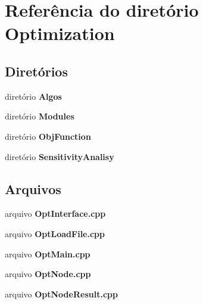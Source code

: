 \section{Referência do diretório Optimization}
\label{dir_cda0b9b7a1b6db4e2b773195a159b93c}
\subsection*{Diretórios}
\begin{DoxyCompactItemize}
\item 
diretório {\bf Algos}
\item 
diretório {\bf Modules}
\item 
diretório {\bf Obj\+Function}
\item 
diretório {\bf Sensitivity\+Analisy}
\end{DoxyCompactItemize}
\subsection*{Arquivos}
\begin{DoxyCompactItemize}
\item 
arquivo {\bf Opt\+Interface.\+cpp}
\item 
arquivo {\bf Opt\+Load\+File.\+cpp}
\item 
arquivo {\bf Opt\+Main.\+cpp}
\item 
arquivo {\bf Opt\+Node.\+cpp}
\item 
arquivo {\bf Opt\+Node\+Result.\+cpp}
\end{DoxyCompactItemize}
